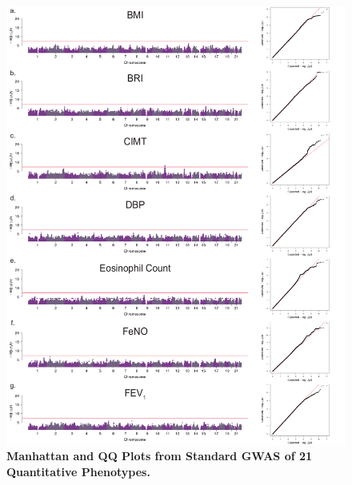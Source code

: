 \begin{figure}[!htb]
\ContinuedFloat*
	\centering
		\includegraphics[width=5in]{img/ch02/fig-s1a.pdf}
	\caption[Manhattan and QQ Plots from Standard GWAS of 21 Quantitative Phenotypes.]{\textbf{Manhattan and QQ Plots from Standard GWAS of 21 Quantitative Phenotypes.} }
	\label{fig:fig-s1a}
\end{figure}

